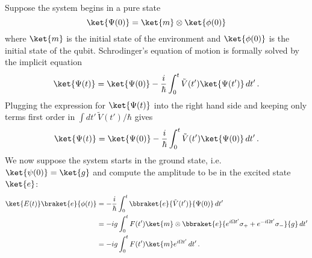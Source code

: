 Suppose the system begins in a pure state
\begin{displaymath}
\ket{\Psi(0)} = \ket{m} \otimes \ket{\phi(0)}
\end{displaymath}
where $\ket{m}$ is the initial state of the environment and $\ket{\phi(0)}$ is the initial state of the qubit.
Schrodinger's equation of motion is formally solved by the implicit equation
\begin{equation}
\ket{\Psi(t)} = \ket{\Psi(0)} - \frac{i}{\hbar} \int_0^t \tilde{V}(t') \ket{\Psi(t')} \, dt' \, .
\end{equation}
Plugging the expression for $\ket{\Psi(t)}$ into the right hand side and keeping only terms first order in $\int dt' \, \tilde{V}(t') / \hbar$ gives
\begin{equation}
\ket{\Psi(t)} = \ket{\Psi(0)} - \frac{i}{\hbar} \int_0^t \tilde{V}(t') \ket{\Psi(0)} \, dt' \, .
\end{equation}
We now suppose the system starts in the ground state, i.e. $\ket{\psi(0)}=\ket{g}$ and compute the amplitude to be in the excited state $\ket{e}$:
\begin{align}
\ket{E(t)}\braket{e}{\phi(t)}
&= -\frac{i}{\hbar} \int_0^t \bbraket{e}{\tilde{V}(t')}{\Psi(0)} \, dt' \\
&= - ig \int_0^t F(t')\ket{m} \otimes \bbraket{e}{e^{i \Omega t'} \sigma_+ + e^{-i \Omega t'} \sigma_-}{g} \, dt' \\
&= - ig \int_0^t F(t')\ket{m} e^{i \Omega t'} \, dt' \, .
\end{align}

